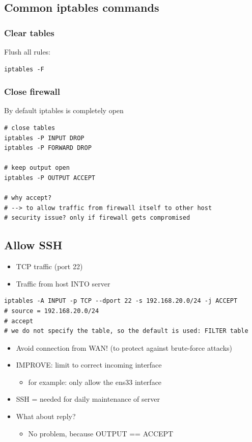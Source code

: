 \documentclass{article}
\begin{document}
\subsection{Common iptables commands}

\subsubsection{Clear tables}

Flush all rules:

\begin{verbatim}
iptables -F
\end{verbatim}

\subsubsection{Close firewall}

By default iptables is completely open

\begin{verbatim}
# close tables
iptables -P INPUT DROP
iptables -P FORWARD DROP

# keep output open
iptables -P OUTPUT ACCEPT

# why accept? 
# --> to allow traffic from firewall itself to other host
# security issue? only if firewall gets compromised
\end{verbatim}


\subsection{Allow SSH}

\begin{itemize}
    \item TCP traffic (port 22)
    \item Traffic from host INTO server
\end{itemize}

\begin{verbatim}
iptables -A INPUT -p TCP --dport 22 -s 192.168.20.0/24 -j ACCEPT
# source = 192.168.20.0/24
# accept 
# we do not specify the table, so the default is used: FILTER table
\end{verbatim}

\begin{itemize}
    \item Avoid connection from WAN! (to protect against brute-force attacks)
    \item IMPROVE: limit to correct incoming interface
    \begin{itemize}
        \item for example: only allow the ens33 interface
    \end{itemize}
    \item SSH = needed for daily maintenance of server
    \item What about reply?
    \begin{itemize}
        \item No problem, because OUTPUT == ACCEPT
    \end{itemize}
\end{itemize}
\end{document}
